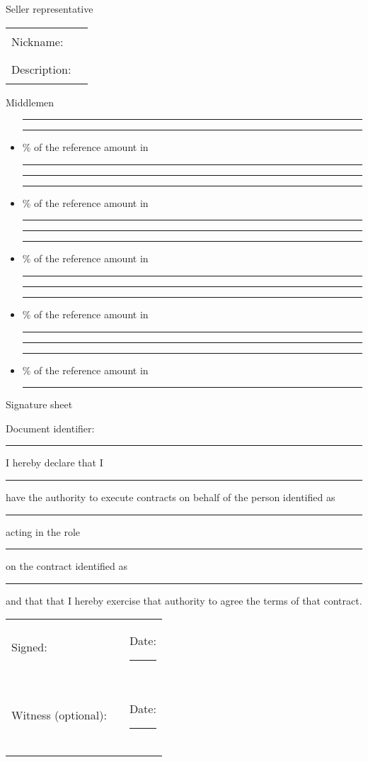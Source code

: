 \documentclass[10pt]{article}
\begin{document}
\begin{center}
  Seller representative
\end{center}

\begin{tabular}{l l}
Nickname: & \rule{5cm}{.2pt} \\
Description: & \rule{5cm}{.2pt} \\
\end{tabular}

\begin{center}
Middlemen
\end{center}

\begin{itemize}
\item \rule{6cm}{.2pt} \rule{1cm}{.2pt} \% of the reference amount in
  \rule{2cm}{.2pt}
\item \rule{6cm}{.2pt} \rule{1cm}{.2pt} \% of the reference amount
  in \rule{2cm}{.2pt}
\item \rule{6cm}{.2pt} \rule{1cm}{.2pt} \% of the reference amount
  in \rule{2cm}{.2pt}
\item \rule{6cm}{.2pt} \rule{1cm}{.2pt} \% of the reference amount
  in \rule{2cm}{.2pt}
\item \rule{6cm}{.2pt} \rule{1cm}{.2pt} \% of the reference amount
  in \rule{2cm}{.2pt}
\end{itemize}



\pagebreak

\begin{center}
{Signature sheet}
\end{center}

Document identifier: \rule{10cm}{.2pt}

\vspace{1cm}

I hereby declare that I \rule{5cm}{.2pt} have the authority to execute
contracts on behalf of the person identified as \rule{5cm}{.2pt}
acting in the role \rule{5cm}{.2pt} on the contract identified as
\rule{5cm}{.2pt} and that that I hereby exercise that authority to
agree the terms of that contract.

\vspace{1cm}

\noindent \begin{tabular}{l l l}
Signed: & \rule{6cm}{.2pt} & Date: \rule{2.4cm}{.2pt}\\
                         &       & \\\\\\

Witness (optional): & \rule{6cm}{.2pt} & Date: \rule{2.4cm}{.2pt}\\ &
& \\\\\\
\end{tabular}
\end{document}
